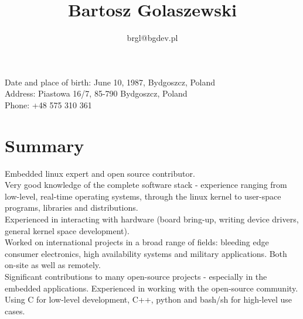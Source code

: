 \documentclass[10pt]{article}
\title{\bfseries\Huge Bartosz Golaszewski}
\author{brgl@bgdev.pl}
\date{}
\begin{document}
	\begin{minipage}{0.65\textwidth}
		\begingroup
		\let\center\flushleft
		\let\endcenter\endflushleft
		\maketitle
		\endgroup
	\end{minipage}
	\begin{minipage}{0.3\textwidth}
	\end{minipage}
	\vspace{2em}
	\linebreak
	\begin{minipage}[ht]{0.68\textwidth}
		Date and place of birth: June 10, 1987, Bydgoszcz, Poland\\
		Address: Piastowa 16/7, 85-790 Bydgoszcz, Poland\\
		Phone: +48 575 310 361
	\end{minipage}

	\vspace{20pt}

\section*{Summary}
Embedded linux expert and open source contributor.\\

Very good knowledge of the complete software stack - experience ranging from low-level, real-time
operating systems, through the linux kernel to user-space programs, libraries and distributions.\\

Experienced in interacting with hardware (board bring-up, writing device drivers, general kernel
space development).\\

Worked on international projects in a broad range of fields: bleeding edge consumer electronics,
high availability systems and military applications. Both on-site as well as remotely.\\

Significant contributions to many open-source projects - especially in the embedded applications.
Experienced in working with the open-source community.\\

Using C for low-level development, C++, python and bash/sh for high-level use cases.\\
\end{document}
